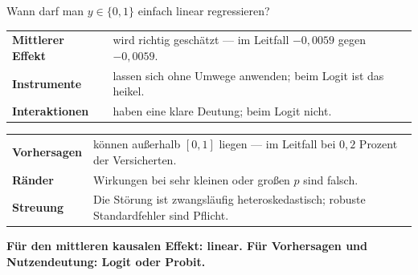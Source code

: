 \begin{aufgabe}
Wann darf man $y\in\{0,1\}$ einfach linear regressieren?

\loesung
{}
\begin{center}
{\small
\renewcommand{\arraystretch}{1.5}
\begin{tabular}{@{}P{2.8cm}P{5.8cm}@{}}
\toprule
\textbf{Mittlerer Effekt} & wird richtig geschätzt --- im Leitfall $-0{,}0059$ gegen $-0{,}0059$.\\
\textbf{Instrumente} & lassen sich ohne Umwege anwenden; beim Logit ist das heikel.\\
\textbf{Interaktionen} & haben eine klare Deutung; beim Logit nicht.\\
\bottomrule
\end{tabular}}
\end{center}

\begin{center}
{\small
\renewcommand{\arraystretch}{1.5}
\begin{tabular}{@{}P{2.8cm}P{5.8cm}@{}}
\toprule
\textbf{Vorhersagen} & können außerhalb $[0,1]$ liegen --- im Leitfall bei $0{,}2$ Prozent der Versicherten.\\
\textbf{Ränder} & Wirkungen bei sehr kleinen oder großen $p$ sind falsch.\\
\textbf{Streuung} & Die Störung ist zwangsläufig heteroskedastisch; robuste Standardfehler sind Pflicht.\\
\bottomrule
\end{tabular}}
\end{center}

\begin{center}
\begin{minipage}{0.9\textwidth}
\textbf{Für den mittleren kausalen Effekt: linear. Für Vorhersagen und Nutzendeutung: Logit oder Probit.}
\end{minipage}
\end{center}

\begin{center}
\begin{minipage}{0.88\textwidth}
\end{minipage}
\end{center}
\end{aufgabe}


